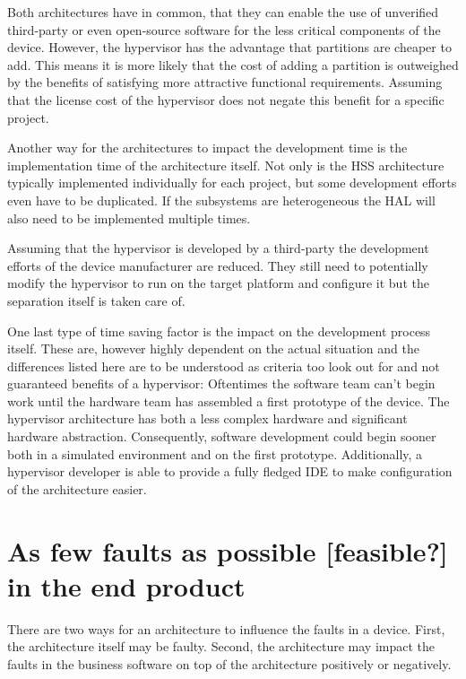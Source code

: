 Both architectures have in common, that they can enable the use of unverified third-party or even open-source software for the less critical  components of the device. However, the hypervisor has the advantage that partitions are cheaper to add. This means it is more likely that the cost of adding a partition is outweighed by the benefits of satisfying more attractive functional requirements. Assuming that the license cost of the hypervisor does not negate this benefit for a specific project.

Another way for the architectures to impact the development time is the implementation time of the architecture itself. Not only is the \gls{HSS} architecture typically implemented individually for each project, but some development efforts even have to be duplicated. If the subsystems are heterogeneous the \gls{HAL} will also need to be implemented multiple times. 

Assuming that the hypervisor is developed by a third-party the development efforts of the device manufacturer are reduced. They still need to potentially modify the hypervisor to run on the target platform and configure it but the separation itself is taken care of.

One last type of time saving factor is the impact on the development process itself. These are, however highly dependent on the actual situation and the differences listed here are to be understood as criteria too look out for and not guaranteed benefits of a hypervisor: Oftentimes the software team can't begin work until the hardware team has assembled a first prototype of the device. The hypervisor architecture has both a less complex hardware and significant hardware abstraction. Consequently, software development could begin sooner both in a simulated environment and on the first prototype. Additionally, a hypervisor developer is able to provide a fully fledged \gls{IDE} to make configuration of the architecture easier.


\section{As few faults as possible [feasible?] in the end product}
There are two ways for an architecture to influence the faults in a device. First, the architecture itself may be faulty. Second, the architecture may impact the faults in the business software on top of the architecture positively or negatively.


